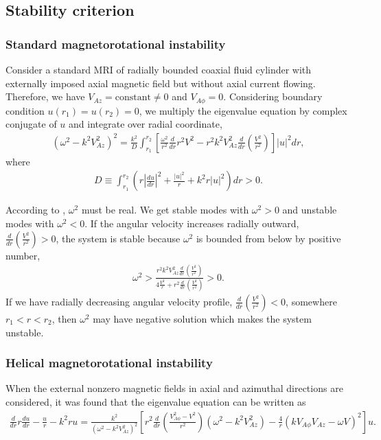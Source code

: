 \documentclass{jfm}
\begin{document}
%
%
\subsection{Stability criterion}

\subsubsection{Standard magnetorotational instability}

Consider a standard MRI of radially bounded coaxial fluid cylinder with 
externally imposed axial magnetic field but without axial current flowing. 
Therefore, we have $V_{Az} = \text{constant} \neq 0$ and 
$V_{A\phi} = 0$. Considering boundary condition 
$u(r_1)=u(r_2)=0$, we multiply the eigenvalue equation by complex conjugate 
of $u$ and integrate over radial coordinate,
\begin{align}
    (\omega^2-k^2 V_{Az}^2)^2 = \frac{k^2}{D}\int_{r_1}^{r_2}\left[\frac{\omega^2}{r^2}\frac{d}{dr}r^2V^2 -r^2 k^2 V_{Az}^2 \frac{d}{dr}\left(\frac{V^2}{r^2}\right)\right]|u|^2 dr ,
\end{align}   
where 
\begin{align}
    D\equiv \int_{r_1}^{r_2}\left(r \left|\frac{du}{dr}\right|^2 +\frac{|u|^2}{r}+k^2 r |u|^2 \right) dr >0 .
\end{align}

According to \cite{Chandrasekhar1960}, $\omega^2$ must be real. We get stable 
modes with $\omega^2>0$ and unstable modes with $\omega^2<0$. If the angular 
velocity increases radially outward, $\frac{d}{dr}\left(\frac{V^2}{r^2}\right)>0$, 
the system is stable because $\omega^2$ is bounded from below by positive number, 
\begin{align}
    \omega^2>\frac{r^2k^2 V_{Az}^2 \frac{d}{dr}\left(\frac{V^2}{r^2}\right)}{4\frac{V^2}{r}+r^2\frac{d}{dr}\left(\frac{V^2}{r^2}\right)}>0.
\end{align}
If we have radially decreasing angular velocity profile, 
$\frac{d}{dr}\left(\frac{V^2}{r^2}\right)<0$, somewhere $r_1<r<r_2$, then 
$\omega^2$ may have negative solution which makes the system unstable.

%
%
\subsubsection{Helical magnetorotational instability}

When the external nonzero magnetic fields in axial and azimuthal directions are
considered, it was found that the eigenvalue equation can be written as
\begin{align}
    \frac{d}{dr}r\frac{du}{dr}-\frac{u}{r}-k^2ru = \frac{k^2}{(\omega^2-k^2 V_{Az}^2)^2}\left[r^2 \frac{d}{dr}\left(\frac{V_{A\phi}^2-V^2}{r^2}\right)
    (\omega^2-k^2V_{Az}^2) 
    -\frac{4}{r}(kV_{A\phi}V_{Az}-\omega V)^2\right]u .
\end{align}
\end{document}
